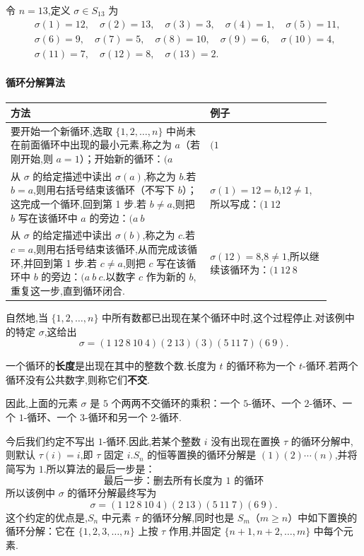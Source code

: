 \begin{example}
	令 $n=13$,定义 $\sigma\in S_{13}$ 为
\begin{align*}
	&\sigma(1)=12,\quad \sigma(2)=13,\quad \sigma(3)=3,\quad \sigma(4)=1,\quad \sigma(5)=11,\\
	&\sigma(6)=9,\quad \sigma(7)=5,\quad \sigma(8)=10,\quad \sigma(9)=6,\quad \sigma(10)=4,\\
	&\sigma(11)=7,\quad \sigma(12)=8,\quad \sigma(13)=2.
\end{align*}

\paragraph{循环分解算法}
\begin{center}
	\begin{tabular}{p{0.56\linewidth}|p{0.34\linewidth}}
		\textbf{方法} & \textbf{例子} \\ \hline
		要开始一个新循环,选取 $\{1,2,\ldots,n\}$ 中尚未在前面循环中出现的最小元素,称之为 $a$（若刚开始,则 $a=1$）；开始新的循环：$(a$
		& $(1$ \\[0.8em]
		从 $\sigma$ 的给定描述中读出 $\sigma(a)$,称之为 $b$.若 $b=a$,则用右括号结束该循环（不写下 $b$）；这完成一个循环,回到第 1 步.若 $b\neq a$,则把 $b$ 写在该循环中 $a$ 的旁边：$(a\ b$
		& $\sigma(1)=12=b$,$12\neq1$,所以写成：$(1\ 12$ \\[0.8em]
		从 $\sigma$ 的给定描述中读出 $\sigma(b)$,称之为 $c$.若 $c=a$,则用右括号结束该循环,从而完成该循环,并回到第 1 步.若 $c\neq a$,则把 $c$ 写在该循环中 $b$ 的旁边：$(a\ b\ c$.以数字 $c$ 作为新的 $b$,重复这一步,直到循环闭合.
		& $\sigma(12)=8$,$8\neq1$,所以继续该循环为：$(1\ 12\ 8$ 
	\end{tabular}
\end{center}
自然地,当 $\{1,2,\ldots,n\}$ 中所有数都已出现在某个循环中时,这个过程停止.对该例中的特定 $\sigma$,这给出
\[
\sigma=(1\ 12\ 8\ 10\ 4)(2\ 13)(3)(5\ 11\ 7)(6\ 9).
\]
\end{example}

\begin{definition}
	一个循环的\textbf{长度}是出现在其中的整数个数.长度为 $t$ 的循环称为一个 $t$-循环.若两个循环没有公共数字,则称它们\textbf{不交}.
\end{definition}
因此,上面的元素 $\sigma$ 是 $5$ 个两两不交循环的乘积：一个 $5$-循环、一个 $2$-循环、一个 $1$-循环、一个 $3$-循环和另一个 $2$-循环.

今后我们约定不写出 $1$-循环.因此,若某个整数 $i$ 没有出现在置换 $\tau$ 的循环分解中,则默认 $\tau(i)=i$,即 $\tau$ 固定 $i$.$S_n$ 的恒等置换的循环分解是 $(1)(2)\cdots(n)$,并将简写为 $1$.所以算法的最后一步是：
\[
\boxed{\text{最后一步：删去所有长度为 }1\text{ 的循环}}
\]
所以该例中 $\sigma$ 的循环分解最终写为
\[
\sigma=(1\ 12\ 8\ 10\ 4)(2\ 13)(5\ 11\ 7)(6\ 9).
\]
这个约定的优点是,$S_n$ 中元素 $\tau$ 的循环分解,同时也是 $S_m$（$m\geq n$）中如下置换的循环分解：它在 $\{1,2,3,\ldots,n\}$ 上按 $\tau$ 作用,并固定 $\{n+1,n+2,\ldots,m\}$ 中每个元素.

